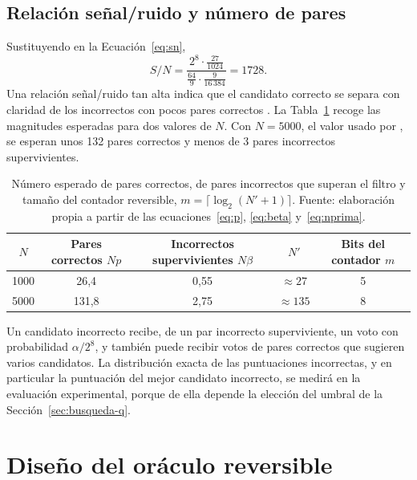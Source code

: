 \subsection{Relación señal/ruido y número de pares}

Sustituyendo en la Ecuación~\ref{eq:sn},
\begin{equation}
 S/N=\frac{2^{8}\cdot\frac{27}{1024}}{\frac{64}{9}\cdot\frac{9}{16\,384}}=1728.
 \label{eq:sn-valor}
\end{equation}
Una relación señal/ruido tan alta indica que el candidato correcto se separa con claridad de los incorrectos con pocos pares correctos \citep{biham1991}. La Tabla~\ref{tab:estadistica} recoge las magnitudes esperadas para dos valores de \(N\). Con \(N=5000\), el valor usado por \citet{heys2002}, se esperan unos 132 pares correctos y menos de 3 pares incorrectos supervivientes.

\begin{table}[H]
\centering
\begin{tabular}{c c c c c}
\hline\hline
\(N\) & Pares correctos \(Np\) & Incorrectos supervivientes \(N\beta\) & \(N'\) & Bits del contador \(m\) \\
\hline
1000 & 26,4 & 0,55 & \(\approx 27\) & 5 \\
5000 & 131,8 & 2,75 & \(\approx 135\) & 8 \\
\hline
\end{tabular}
\caption[Magnitudes esperadas del filtrado]{Número esperado de pares correctos, de pares incorrectos que superan el filtro y tamaño del contador reversible, \(m=\lceil\log_2(N'+1)\rceil\). Fuente: elaboración propia a partir de las ecuaciones~\ref{eq:p}, \ref{eq:beta} y~\ref{eq:nprima}.}
\label{tab:estadistica}
\end{table}

Un candidato incorrecto recibe, de un par incorrecto superviviente, un voto con probabilidad \(\alpha/2^8\), y también puede recibir votos de pares correctos que sugieren varios candidatos. La distribución exacta de las puntuaciones incorrectas, y en particular la puntuación del mejor candidato incorrecto, se medirá en la evaluación experimental, porque de ella depende la elección del umbral de la Sección~\ref{sec:busqueda-q}.

\section{Diseño del oráculo reversible}
\label{sec:oraculo}

